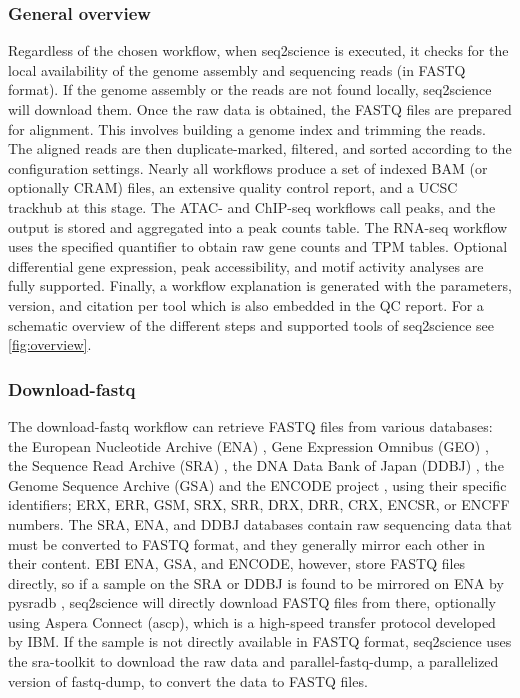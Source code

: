 \subsubsection{General overview}

Regardless of the chosen workflow, when seq2science is executed, it checks for the local availability of the genome assembly and sequencing reads (in FASTQ format). If the genome assembly or the reads are not found locally, seq2science will download them. Once the raw data is obtained, the FASTQ files are prepared for alignment. This involves  building a genome index and trimming the reads. The aligned reads are then duplicate-marked, filtered, and sorted according to the configuration settings. Nearly all workflows produce a set of indexed BAM (or optionally CRAM) files, an extensive quality control report, and a UCSC trackhub at this stage. The ATAC- and ChIP-seq workflows call peaks, and the output is stored and aggregated into a peak counts table. The RNA-seq workflow uses the specified quantifier to obtain raw gene counts and TPM tables. Optional differential gene expression, peak accessibility, and motif activity analyses are fully supported. Finally, a workflow explanation is generated with the parameters, version, and citation per tool which is also embedded in the QC report. For a schematic overview of the different steps and supported tools of seq2science see \autoref{fig:overview}. 

\subsubsection{Download-fastq}

The download-fastq workflow can retrieve FASTQ files from various databases: the European Nucleotide Archive (ENA) \cite{ENA}, Gene Expression Omnibus (GEO) \cite{GEO}, the Sequence Read Archive (SRA) \cite{Leinonen2010}, the DNA Data Bank of Japan (DDBJ) \cite{DDBJ}, the Genome Sequence Archive (GSA) \cite{GSA} and the ENCODE project \cite{Luo2019}, using their specific identifiers; ERX, ERR, GSM, SRX, SRR, DRX, DRR, CRX, ENCSR, or ENCFF numbers. The SRA, ENA, and DDBJ databases contain raw sequencing data that must be converted to FASTQ format, and they generally mirror each other in their content. EBI ENA, GSA, and ENCODE, however, store FASTQ files directly, so if a sample on the SRA or DDBJ is found to be mirrored on ENA by pysradb \cite{Choudhary2019}, seq2science will directly download FASTQ files from there, optionally using Aspera Connect (ascp), which is a high-speed transfer protocol developed by IBM. If the sample is not directly available in FASTQ format, seq2science uses the sra-toolkit \cite{Leinonen2010} to download the raw data and parallel-fastq-dump, a parallelized version of fastq-dump, to convert the data to FASTQ files.

